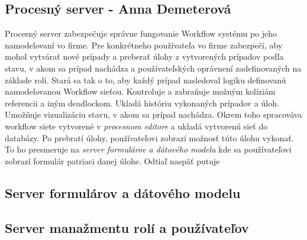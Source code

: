 \subsection{Procesný server - Anna Demeterová}
Procesný server zabezpečuje správne fungovanie Workflow systému po jeho namodelovaní vo firme. Pre konkrétneho používateľa vo firme zabezpečí, aby mohol vytvárať nové prípady a preberať úlohy z vytvorených prípadov podľa stavu, v akom sa prípad nachádza a používateľských oprávnení zadefinovaných na základe rolí. Stará sa tak o to, aby každý prípad nasledoval logiku definovanú namodelovanou Workflow sieťou. Kontroluje a zabraňuje možným  kolíziám referencii a iným deadlockom.  
Ukladá históriu vykonaných prípadov a úloh. Umožňuje vizualizáciu stavu, v akom sa prípad nachádza. Okrem toho spracováva workflow siete vytvorené v \emph{procesnom editore} a ukladá vytvorenú sieť do databázy. Po prebratí úlohy, používateľovi zobrazí možnosť túto úlohu vykonať. To ho presmeruje na \emph{server formulárov a dátového modelu} kde sa používateľovi zobrazí formulár patriaci danej úlohe. Odtiaľ naspäť putuje 

\subsection{Server formulárov a dátového modelu}
\subsection{Server manažmentu rolí a používateľov}

	


	

